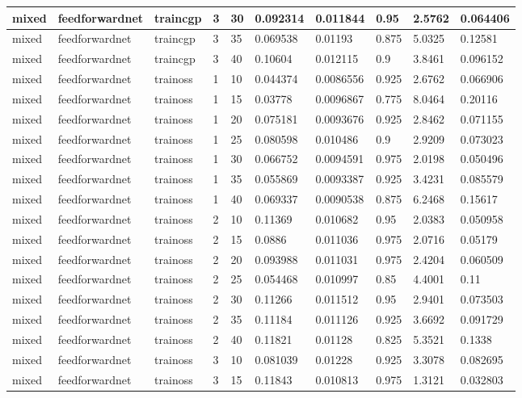 \begin{longtable}{lllllllll}
mixed & feedforwardnet & traincgp & 3 & 30 & 0.092314 & 0.011844 & 0.95 & 2.5762 & 0.064406 \\ \hline 
mixed & feedforwardnet & traincgp & 3 & 35 & 0.069538 & 0.01193 & 0.875 & 5.0325 & 0.12581 \\ \hline 
mixed & feedforwardnet & traincgp & 3 & 40 & 0.10604 & 0.012115 & 0.9 & 3.8461 & 0.096152 \\ \hline 
mixed & feedforwardnet & trainoss & 1 & 10 & 0.044374 & 0.0086556 & 0.925 & 2.6762 & 0.066906 \\ \hline 
mixed & feedforwardnet & trainoss & 1 & 15 & 0.03778 & 0.0096867 & 0.775 & 8.0464 & 0.20116 \\ \hline 
mixed & feedforwardnet & trainoss & 1 & 20 & 0.075181 & 0.0093676 & 0.925 & 2.8462 & 0.071155 \\ \hline 
mixed & feedforwardnet & trainoss & 1 & 25 & 0.080598 & 0.010486 & 0.9 & 2.9209 & 0.073023 \\ \hline 
mixed & feedforwardnet & trainoss & 1 & 30 & 0.066752 & 0.0094591 & 0.975 & 2.0198 & 0.050496 \\ \hline 
mixed & feedforwardnet & trainoss & 1 & 35 & 0.055869 & 0.0093387 & 0.925 & 3.4231 & 0.085579 \\ \hline 
mixed & feedforwardnet & trainoss & 1 & 40 & 0.069337 & 0.0090538 & 0.875 & 6.2468 & 0.15617 \\ \hline 
mixed & feedforwardnet & trainoss & 2 & 10 & 0.11369 & 0.010682 & 0.95 & 2.0383 & 0.050958 \\ \hline 
mixed & feedforwardnet & trainoss & 2 & 15 & 0.0886 & 0.011036 & 0.975 & 2.0716 & 0.05179 \\ \hline 
mixed & feedforwardnet & trainoss & 2 & 20 & 0.093988 & 0.011031 & 0.975 & 2.4204 & 0.060509 \\ \hline 
mixed & feedforwardnet & trainoss & 2 & 25 & 0.054468 & 0.010997 & 0.85 & 4.4001 & 0.11 \\ \hline 
mixed & feedforwardnet & trainoss & 2 & 30 & 0.11266 & 0.011512 & 0.95 & 2.9401 & 0.073503 \\ \hline 
mixed & feedforwardnet & trainoss & 2 & 35 & 0.11184 & 0.011126 & 0.925 & 3.6692 & 0.091729 \\ \hline 
mixed & feedforwardnet & trainoss & 2 & 40 & 0.11821 & 0.01128 & 0.825 & 5.3521 & 0.1338 \\ \hline 
mixed & feedforwardnet & trainoss & 3 & 10 & 0.081039 & 0.01228 & 0.925 & 3.3078 & 0.082695 \\ \hline 
mixed & feedforwardnet & trainoss & 3 & 15 & 0.11843 & 0.010813 & 0.975 & 1.3121 & 0.032803 \\ \hline 

\end{longtable}
